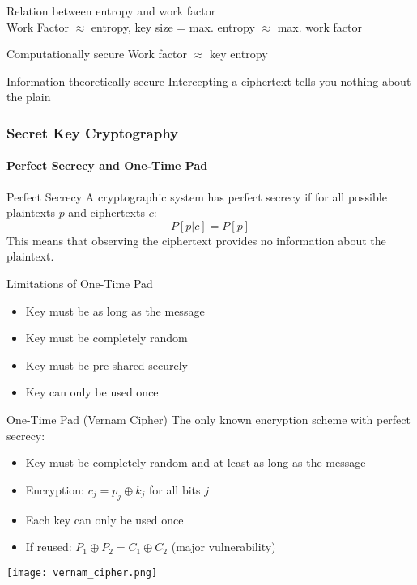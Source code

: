 \begin{theorem}{Relation between entropy and work factor}\\
    Work Factor $\approx$ entropy, key size = max. entropy $\approx$ max. work factor
\end{theorem}

\begin{definition}{Computationally secure}
    Work factor $\approx$ key entropy
\end{definition}


\multend

\begin{definition}{Information-theoretically secure}
    Intercepting a ciphertext tells you nothing about the plain
\end{definition}


\subsubsection{Secret Key Cryptography}

\paragraph{Perfect Secrecy and One-Time Pad}


\begin{theorem}{Perfect Secrecy}
    A cryptographic system has perfect secrecy if for all possible plaintexts $p$ and ciphertexts $c$:
    $$
        P[p|c] = P[p]
    $$
    This means that observing the ciphertext provides no information about the plaintext.
\end{theorem}

\begin{concept}{Limitations of One-Time Pad}
    \begin{itemize}
        \item Key must be as long as the message
        \item Key must be completely random
        \item Key must be pre-shared securely
        \item Key can only be used once
    \end{itemize}
\end{concept}

\begin{concept}{One-Time Pad (Vernam Cipher)}
    The only known encryption scheme with perfect secrecy:
    \begin{itemize}
        \item Key must be completely random and at least as long as the message
        \item Encryption: $c_j = p_j \oplus k_j$ for all bits $j$
        \item Each key can only be used once
        \item If reused: $P_1 \oplus P_2 = C_1 \oplus C_2$ (major vulnerability)
    \end{itemize}
    \texttt{[image: vernam\_cipher.png]}
\end{concept}

